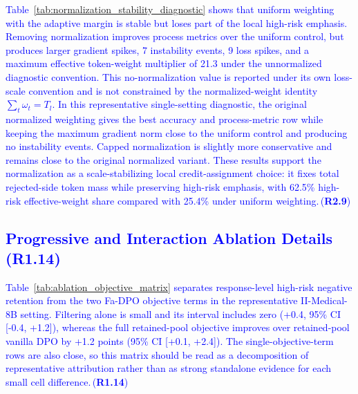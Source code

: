 \documentclass[a4paper,fleqn,doubleblind]{cas-sc}
\DeclareRobustCommand{\added}[1]{\textcolor{blue}{#1}}
\DeclareRobustCommand{\revtag}[1]{\textcolor{blue}{\scriptsize\,(\textbf{#1})}}
\begin{document}
\added{Table~\ref{tab:normalization_stability_diagnostic} shows that uniform weighting with the adaptive margin is stable but loses part of the local high-risk emphasis. Removing normalization improves process metrics over the uniform control, but produces larger gradient spikes, 7 instability events, 9 loss spikes, and a maximum effective token-weight multiplier of 21.3 under the unnormalized diagnostic convention. This no-normalization value is reported under its own loss-scale convention and is not constrained by the normalized-weight identity $\sum_t\omega_t=T_l$. In this representative single-setting diagnostic, the original normalized weighting gives the best accuracy and process-metric row while keeping the maximum gradient norm close to the uniform control and producing no instability events. Capped normalization is slightly more conservative and remains close to the original normalized variant. These results support the normalization as a scale-stabilizing local credit-assignment choice: it fixes total rejected-side token mass while preserving high-risk emphasis, with 62.5\% high-risk effective-weight share compared with 25.4\% under uniform weighting.}\revtag{R2.9}

\subsection{\added{Progressive and Interaction Ablation Details}\revtag{R1.14}}
\label{app:ablation_details}

\added{Table~\ref{tab:ablation_objective_matrix} separates response-level high-risk negative retention from the two Fa-DPO objective terms in the representative II-Medical-8B setting. Filtering alone is small and its interval includes zero (+0.4, 95\% CI [-0.4, +1.2]), whereas the full retained-pool objective improves over retained-pool vanilla DPO by +1.2 points (95\% CI [+0.1, +2.4]). The single-objective-term rows are also close, so this matrix should be read as a decomposition of representative attribution rather than as strong standalone evidence for each small cell difference.}\revtag{R1.14}
\end{document}
